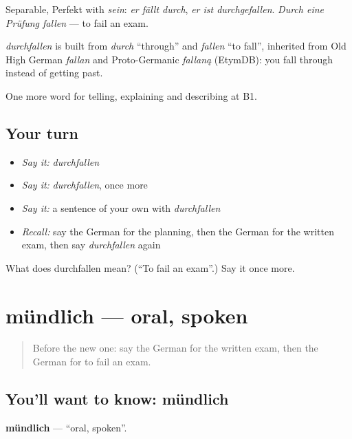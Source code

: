 Separable, Perfekt with \emph{sein}: \emph{er fällt durch}, \emph{er ist durchgefallen}. \emph{Durch eine Prüfung fallen} — to fail an exam.

\begin{cousinweb}
\emph{durchfallen} is built from \emph{durch} \textquotedblleft{}through\textquotedblright{} and \emph{fallen} \textquotedblleft{}to fall\textquotedblright{}, inherited from Old High German \emph{fallan} and Proto-Germanic \emph{fallaną} (EtymDB): you fall through instead of getting past.
\end{cousinweb}

\begin{grammarlens}[title={What you've built}]
One more word for telling, explaining and describing at B1.
\end{grammarlens}

\subsection*{Your turn}
\begin{itemize}
\raggedright
  \item \emph{Say it:} \emph{durchfallen}
  \item \emph{Say it:} \emph{durchfallen}, once more
  \item \emph{Say it:} a sentence of your own with \emph{durchfallen}
  \item \emph{Recall:} say the German for the planning, then the German for the written exam, then say \emph{durchfallen} again
\end{itemize}

\begin{tcolorbox}[breakable,colback=teal!4,colframe=teal!35!black,title={Before you move on}]
What does durchfallen mean? (\textquotedblleft{}To fail an exam\textquotedblright{}.) Say it once more.
\end{tcolorbox}
\section[mündlich]{mündlich — oral, spoken}

\label{lesson:GE-C375-muendlich}



\begin{quote}
Before the new one: say the German for the written exam, then the German for to fail an exam.
\end{quote}

\subsection*{You'll want to know: mündlich}
\textbf{mündlich} — \textquotedblleft{}oral, spoken\textquotedblright{}.

